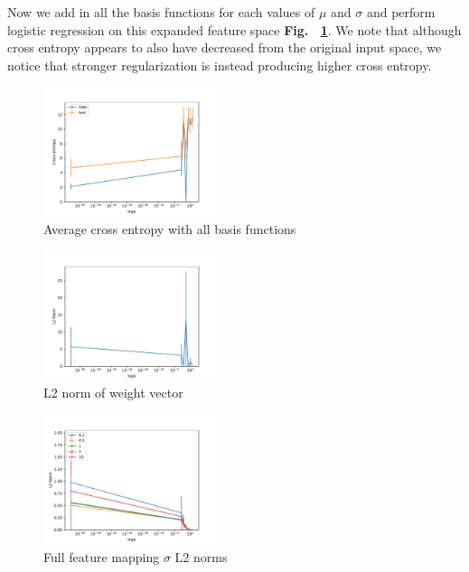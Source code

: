 \documentclass[11pt]{amsart}
\begin{document}
Now we add in all the basis functions for each values of $\mu$ and $\sigma$ and perform logistic regression on this expanded feature space {\bf Fig. ~\ref{fig:q1g}}. We note that although cross entropy appears to also have decreased from the original input space, we notice that stronger regularization is instead producing higher cross entropy. 

\begin{figure}[h]
	\centering
		\includegraphics[width=0.45\textwidth]{all_sigmas.pdf}
		\caption{Average cross entropy with all basis functions}
		\label{fig:q1g}
\end{figure}

\begin{figure}
		\includegraphics[width=0.45\textwidth]{all_sigmas_norm.pdf}
		\caption{L2 norm of weight vector}
\end{figure}

\begin{figure}[h!]
	\centering
	\includegraphics[width=0.45\textwidth]{all_sigma_norms.pdf}
	\caption{Full feature mapping $\sigma$ L2 norms}
	\label{fig:q1f}
\end{figure}
\end{document}
